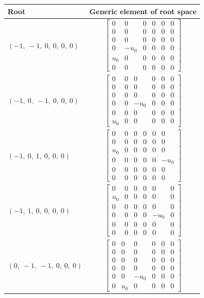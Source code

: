 \documentclass[11pt]{article}
\theoremstyle{definition}
\begin{document}
\bigskip

\noindent \begin{longtable}{|l|c|}
    \hline
    \textbf{Root} & \textbf{Generic element of root space} \\
    \hline
    \endhead
    $\left( -1, \  -1, \  0, \  0, \  0, \  0\right)$ & ${\left[\begin{matrix}0 & 0 & 0 & 0 & 0 & 0\\0 & 0 & 0 & 0 & 0 & 0\\0 & 0 & 0 & 0 & 0 & 0\\0 & - u_{0} & 0 & 0 & 0 & 0\\u_{0} & 0 & 0 & 0 & 0 & 0\\0 & 0 & 0 & 0 & 0 & 0\end{matrix}\right]}$ \\
    \hline
    $\left( -1, \  0, \  -1, \  0, \  0, \  0\right)$ & ${\left[\begin{matrix}0 & 0 & 0 & 0 & 0 & 0\\0 & 0 & 0 & 0 & 0 & 0\\0 & 0 & 0 & 0 & 0 & 0\\0 & 0 & - u_{0} & 0 & 0 & 0\\0 & 0 & 0 & 0 & 0 & 0\\u_{0} & 0 & 0 & 0 & 0 & 0\end{matrix}\right]}$ \\
    \hline
    $\left( -1, \  0, \  1, \  0, \  0, \  0\right)$ & ${\left[\begin{matrix}0 & 0 & 0 & 0 & 0 & 0\\0 & 0 & 0 & 0 & 0 & 0\\u_{0} & 0 & 0 & 0 & 0 & 0\\0 & 0 & 0 & 0 & 0 & - u_{0}\\0 & 0 & 0 & 0 & 0 & 0\\0 & 0 & 0 & 0 & 0 & 0\end{matrix}\right]}$ \\
    \hline
    $\left( -1, \  1, \  0, \  0, \  0, \  0\right)$ & ${\left[\begin{matrix}0 & 0 & 0 & 0 & 0 & 0\\u_{0} & 0 & 0 & 0 & 0 & 0\\0 & 0 & 0 & 0 & 0 & 0\\0 & 0 & 0 & 0 & - u_{0} & 0\\0 & 0 & 0 & 0 & 0 & 0\\0 & 0 & 0 & 0 & 0 & 0\end{matrix}\right]}$ \\
    \hline
    $\left( 0, \  -1, \  -1, \  0, \  0, \  0\right)$ & ${\left[\begin{matrix}0 & 0 & 0 & 0 & 0 & 0\\0 & 0 & 0 & 0 & 0 & 0\\0 & 0 & 0 & 0 & 0 & 0\\0 & 0 & 0 & 0 & 0 & 0\\0 & 0 & - u_{0} & 0 & 0 & 0\\0 & u_{0} & 0 & 0 & 0 & 0\end{matrix}\right]}$ \\

\end{longtable}
\end{document}
